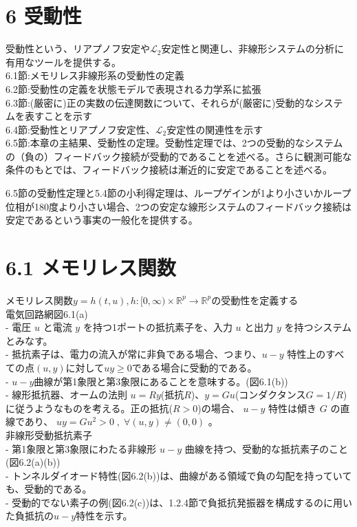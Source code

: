 \documentclass{jsarticle}
\begin{document}
\section*{6 受動性}

受動性という、リアプノフ安定や$\mathcal L_2$安定性と関連し、非線形システムの分析に有用なツールを提供する。\\
6.1節:メモリレス非線形系の受動性の定義\\
6.2節:受動性の定義を状態モデルで表現される力学系に拡張\\
6.3節:(厳密に)正の実数の伝達関数について、それらが(厳密に)受動的なシステムを表すことを示す\\
6.4節:受動性とリアプノフ安定性、$\mathcal L_2$安定性の関連性を示す\\
6.5節:本章の主結果、受動性の定理。受動性定理では、2つの受動的なシステムの（負の）フィードバック接続が受動的であることを述べる。さらに観測可能な条件のもとでは、フィードバック接続は漸近的に安定であることを述べる。

6.5節の受動性定理と5.4節の小利得定理は、ループゲインが1より小さいかループ位相が180度より小さい場合、2つの安定な線形システムのフィードバック接続は安定であるという事実の一般化を提供する。

\section*{6.1 メモリレス関数}
メモリレス関数$y=h(t, u),h\colon [0, \infty) \times \mathbb R^p \rightarrow \mathbb R^p$の受動性を定義する\\

電気回路網図6.1(a)\\
- 電圧 $u$ と電流 $y$ を持つ1ポートの抵抗素子を、入力 $u$ と出力 $y$ を持つシステムとみなす。\\
- 抵抗素子は、電力の流入が常に非負である場合、つまり、$u-y$ 特性上のすべての点$(u, y)$に対して$uy \geq 0$である場合に受動的である。\\
- $u-y$曲線が第1象限と第3象限にあることを意味する。(図6.1(b))\\
- 線形抵抗器、オームの法則 $u = Ry$(抵抗$R$)、$y = Gu$(コンダクタンス$G=1/R$) に従うようなものを考える。正の抵抗($R>0$)の場合、 $u-y$ 特性は傾き $G$ の直線であり、 $uy=Gu^2>0\;,\;\forall (u,y)\neq (0,0)$ 。\\

非線形受動抵抗素子\\
- 第1象限と第3象限にわたる非線形 $u-y$ 曲線を持つ、受動的な抵抗素子のこと(図6.2(a)(b))\\
- トンネルダイオード特性(図6.2(b))は、曲線がある領域で負の勾配を持っていても、受動的である。\\
- 受動的でない素子の例(図6.2(c))は、1.2.4節で負抵抗発振器を構成するのに用いた負抵抗の$u-y$特性を示す。\\
\end{document}
